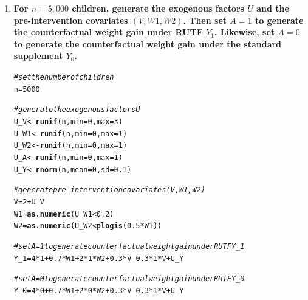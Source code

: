 \documentclass{article}\usepackage[]{graphicx}\usepackage[]{xcolor}
\makeatletter
\newcommand{\hlnum}[1]{\textcolor[rgb]{0.686,0.059,0.569}{#1}}%
\newcommand{\hlcom}[1]{\textcolor[rgb]{0.678,0.584,0.686}{\textit{#1}}}%
\newcommand{\hlopt}[1]{\textcolor[rgb]{0,0,0}{#1}}%
\newcommand{\hlstd}[1]{\textcolor[rgb]{0.345,0.345,0.345}{#1}}%
\newcommand{\hlkwb}[1]{\textcolor[rgb]{0.69,0.353,0.396}{#1}}%
\newcommand{\hlkwc}[1]{\textcolor[rgb]{0.333,0.667,0.333}{#1}}%
\newcommand{\hlkwd}[1]{\textcolor[rgb]{0.737,0.353,0.396}{\textbf{#1}}}%
\newenvironment{kframe}{%
 \def\at@end@of@kframe{}%
 \ifinner\ifhmode%
  \def\at@end@of@kframe{\end{minipage}}%
  \begin{minipage}{\columnwidth}%
 \fi\fi%
 \def\FrameCommand##1{\hskip\@totalleftmargin \hskip-\fboxsep
 \colorbox{shadecolor}{##1}\hskip-\fboxsep
     \hskip-\linewidth \hskip-\@totalleftmargin \hskip\columnwidth}%
 \MakeFramed {\advance\hsize-\width
   \@totalleftmargin\z@ \linewidth\hsize
   \@setminipage}}%
 {\par\unskip\endMakeFramed%
 \at@end@of@kframe}
\newenvironment{knitrout}{}{} %
\makeatother
\begin{document}
\begin{enumerate}[label=\textbf{\arabic*.}]

  \item \textbf{For $n = 5,000$ children, generate the exogenous factors $U$ and the pre-intervention covariates $(V, W1, W2)$. Then set $A = 1$ to generate the counterfactual weight gain under RUTF $Y_1$. Likewise, set $A = 0$ to generate the counterfactual weight gain under the standard supplement $Y_0$.}
  
\begin{knitrout}
\color{fgcolor}\begin{kframe}
\begin{alltt}
\hlcom{# set the number of children}
\hlstd{n} \hlkwb{=} \hlnum{5000}

\hlcom{# generate the exogenous factors U}
\hlstd{U_V} \hlkwb{<-} \hlkwd{runif}\hlstd{(n,} \hlkwc{min} \hlstd{=} \hlnum{0}\hlstd{,} \hlkwc{max} \hlstd{=} \hlnum{3}\hlstd{)}
\hlstd{U_W1} \hlkwb{<-} \hlkwd{runif}\hlstd{(n,} \hlkwc{min} \hlstd{=} \hlnum{0}\hlstd{,} \hlkwc{max} \hlstd{=} \hlnum{1}\hlstd{)}
\hlstd{U_W2} \hlkwb{<-} \hlkwd{runif}\hlstd{(n,} \hlkwc{min} \hlstd{=} \hlnum{0}\hlstd{,} \hlkwc{max} \hlstd{=} \hlnum{1}\hlstd{)}
\hlstd{U_A} \hlkwb{<-} \hlkwd{runif}\hlstd{(n,} \hlkwc{min} \hlstd{=} \hlnum{0}\hlstd{,} \hlkwc{max} \hlstd{=} \hlnum{1}\hlstd{)}
\hlstd{U_Y} \hlkwb{<-} \hlkwd{rnorm}\hlstd{(n,} \hlkwc{mean} \hlstd{=} \hlnum{0}\hlstd{,} \hlkwc{sd} \hlstd{=} \hlnum{0.1}\hlstd{)}

\hlcom{# generate pre-intervention covariates (V, W1, W2)}
\hlstd{V} \hlkwb{=} \hlnum{2} \hlopt{+} \hlstd{U_V}
\hlstd{W1} \hlkwb{=} \hlkwd{as.numeric}\hlstd{(U_W1} \hlopt{<} \hlnum{0.2}\hlstd{)}
\hlstd{W2} \hlkwb{=} \hlkwd{as.numeric}\hlstd{(U_W2} \hlopt{<} \hlkwd{plogis}\hlstd{(}\hlnum{0.5}\hlopt{*}\hlstd{W1))}

\hlcom{# set A = 1 to generate counterfactual weight gain under RUTF Y_1}
\hlstd{Y_1} \hlkwb{=} \hlnum{4}\hlopt{*}\hlnum{1} \hlopt{+} \hlnum{0.7}\hlopt{*}\hlstd{W1} \hlopt{+} \hlnum{2}\hlopt{*}\hlnum{1}\hlopt{*}\hlstd{W2} \hlopt{+} \hlnum{0.3}\hlopt{*}\hlstd{V} \hlopt{-} \hlnum{0.3}\hlopt{*}\hlnum{1}\hlopt{*}\hlstd{V} \hlopt{+} \hlstd{U_Y}

\hlcom{# set A = 0 to generate counterfactual weight gain under RUTF Y_0}
\hlstd{Y_0} \hlkwb{=} \hlnum{4}\hlopt{*}\hlnum{0} \hlopt{+} \hlnum{0.7}\hlopt{*}\hlstd{W1} \hlopt{+} \hlnum{2}\hlopt{*}\hlnum{0}\hlopt{*}\hlstd{W2} \hlopt{+} \hlnum{0.3}\hlopt{*}\hlstd{V} \hlopt{-} \hlnum{0.3}\hlopt{*}\hlnum{1}\hlopt{*}\hlstd{V} \hlopt{+} \hlstd{U_Y}
\end{alltt}
\end{kframe}
\end{knitrout}
  

\end{enumerate}
\end{document}
